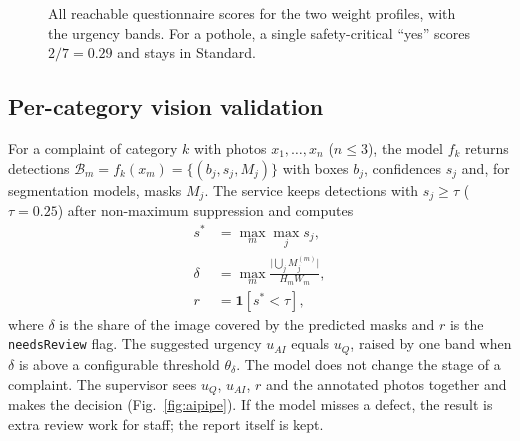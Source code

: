 \documentclass[conference]{IEEEtran}
\begin{document}
\begin{figure}[t]
\centering
{}
\caption{All reachable questionnaire scores for the two weight profiles, with the urgency bands. For a pothole, a single safety-critical ``yes'' scores $2/7=0.29$ and stays in Standard.}
\label{fig:urg}
\end{figure}

\subsection{Per-category vision validation}\label{sec:ai}
For a complaint of category $k$ with photos $x_1,\dots,x_n$ ($n\le3$), the model $f_k$ returns detections $\mathcal{B}_m=f_k(x_m)=\{(b_j,s_j,M_j)\}$ with boxes $b_j$, confidences $s_j$ and, for segmentation models, masks $M_j$. The service keeps detections with $s_j\ge\tau$ ($\tau=0.25$) after non-maximum suppression and computes
\begin{align}
s^{*}&=\max_{m}\max_{j} s_j, \label{eq:smax}\\
\delta&=\max_{m}\frac{\bigl|\bigcup_j M_j^{(m)}\bigr|}{H_m W_m}, \label{eq:delta}\\
r&=\mathbf{1}\left[s^{*}<\tau\right], \label{eq:review}
\end{align}
where $\delta$ is the share of the image covered by the predicted masks and $r$ is the \texttt{needsReview} flag. The suggested urgency $u_{AI}$ equals $u_Q$, raised by one band when $\delta$ is above a configurable threshold $\theta_\delta$. The model does not change the stage of a complaint. The supervisor sees $u_Q$, $u_{AI}$, $r$ and the annotated photos together and makes the decision (Fig.~\ref{fig:aipipe}). If the model misses a defect, the result is extra review work for staff; the report itself is kept.
\end{document}
